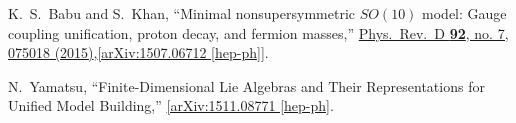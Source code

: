 \documentclass[11pt,prd,superscriptaddress,nofootinbib]{revtex4-1}
\numberwithin{equation}{section}
\begin{document}
\begin{thebibliography}{srt}
  K.~S.~Babu and S.~Khan,
  ``Minimal nonsupersymmetric $SO(10)$ model: Gauge coupling unification, proton decay, and fermion masses,''
  \href{https://journals.aps.org/prd/abstract/10.1103/PhysRevD.10.275}{Phys.\ Rev.\ D {\bf 92}, no. 7, 075018 (2015)},\href{https://arxiv.org/abs/1507.06712}{[arXiv:1507.06712 [hep-ph]]}. 
 
  N.~Yamatsu,
  ``Finite-Dimensional Lie Algebras and Their Representations for Unified Model Building,''
  \href{https://arxiv.org/abs/1511.08771}{[arXiv:1511.08771 [hep-ph]}. 
 
\end{thebibliography}
\end{document}
